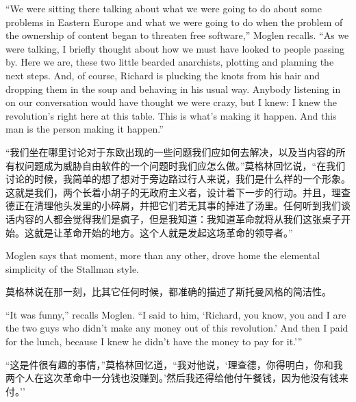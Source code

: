\ifdefined\eng
``We were sitting there talking about what we were going to do about some problems in Eastern Europe and what we were going to do when the problem of the ownership of content began to threaten free software,'' Moglen recalls. ``As we were talking, I briefly thought about how we must have looked to people passing by. Here we are, these two little bearded anarchists, plotting and planning the next steps. And, of course, Richard is plucking the knots from his hair and dropping them in the soup and behaving in his usual way. Anybody listening in on our conversation would have thought we were crazy, but I knew: I knew the revolution's right here at this table. This is what's making it happen. And this man is the person making it happen.''
\fi

\ifdefined\chs
``我们坐在哪里讨论对于东欧出现的一些问题我们应如何去解决，以及当内容的所有权问题成为威胁自由软件的一个问题时我们应怎么做。''莫格林回忆说，``在我们讨论的时候，我简单的想了想对于旁边路过行人来说，我们是什么样的一个形象。这就是我们，两个长着小胡子的无政府主义者，设计着下一步的行动。并且，理查德正在清理他头发里的小碎屑，并把它们若无其事的掉进了汤里。任何听到我们谈话内容的人都会觉得我们是疯子，但是我知道：我知道革命就将从我们这张桌子开始。这就是让革命开始的地方。这个人就是发起这场革命的领导者。''
\fi

\ifdefined\eng
Moglen says that moment, more than any other, drove home the elemental simplicity of the Stallman style.
\fi

\ifdefined\chs
莫格林说在那一刻，比其它任何时候，都准确的描述了斯托曼风格的简洁性。
\fi

\ifdefined\eng
``It was funny,'' recalls Moglen. ``I said to him, `Richard, you know, you and I are the two guys who didn't make any money out of this revolution.' And then I paid for the lunch, because I knew he didn't have the money to pay for it.'\hspace{0.01in}''%
\fi

\ifdefined\chs
``这是件很有趣的事情，''莫格林回忆道，``我对他说，`理查德，你得明白，你和我两个人在这次革命中一分钱也没赚到。'然后我还得给他付午餐钱，因为他没有钱来付。'' %
\fi

\theendnotes
\setcounter{endnote}{0}
